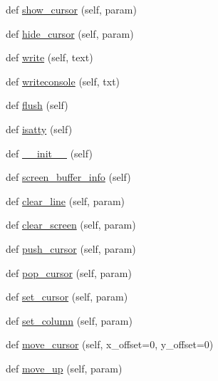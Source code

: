 \begin{DoxyCompactItemize}
def \hyperlink{classwaflib_1_1ansiterm_1_1_ansi_term_a594f6cf62d5e4ca33f2b88127fd6393d}{show\+\_\+cursor} (self, param)
\item 
def \hyperlink{classwaflib_1_1ansiterm_1_1_ansi_term_a2ca4bde33edd4afa92c8bda3f01d1dc9}{hide\+\_\+cursor} (self, param)
\item 
def \hyperlink{classwaflib_1_1ansiterm_1_1_ansi_term_a03ecdf1c9e54a69800aae320175c281b}{write} (self, text)
\item 
def \hyperlink{classwaflib_1_1ansiterm_1_1_ansi_term_a8296f875a3fd0a03fc109073f2a73a3e}{writeconsole} (self, txt)
\item 
def \hyperlink{classwaflib_1_1ansiterm_1_1_ansi_term_a08667242c11cdfd8b74d64f8191d4938}{flush} (self)
\item 
def \hyperlink{classwaflib_1_1ansiterm_1_1_ansi_term_a08e698612e76adc1aa3e26cdc5cb2009}{isatty} (self)
\item 
def \hyperlink{classwaflib_1_1ansiterm_1_1_ansi_term_ab397a7401f836bb9f96d9e54c6333821}{\+\_\+\+\_\+init\+\_\+\+\_\+} (self)
\item 
def \hyperlink{classwaflib_1_1ansiterm_1_1_ansi_term_afdb1bac8f2508bdf2279320b85286196}{screen\+\_\+buffer\+\_\+info} (self)
\item 
def \hyperlink{classwaflib_1_1ansiterm_1_1_ansi_term_ae9df276c42e0569ad63c20c19de62b93}{clear\+\_\+line} (self, param)
\item 
def \hyperlink{classwaflib_1_1ansiterm_1_1_ansi_term_aa94cc04f29c4c51e0013e5cb87c0fd07}{clear\+\_\+screen} (self, param)
\item 
def \hyperlink{classwaflib_1_1ansiterm_1_1_ansi_term_a9f489138508401c64c6927f215d8d6da}{push\+\_\+cursor} (self, param)
\item 
def \hyperlink{classwaflib_1_1ansiterm_1_1_ansi_term_a2093c2f7ded18188b0bf2989a0083a18}{pop\+\_\+cursor} (self, param)
\item 
def \hyperlink{classwaflib_1_1ansiterm_1_1_ansi_term_aba842837a7fe351aa8459aa375249c69}{set\+\_\+cursor} (self, param)
\item 
def \hyperlink{classwaflib_1_1ansiterm_1_1_ansi_term_acd65956a7d56681cc669acca5bdd43fb}{set\+\_\+column} (self, param)
\item 
def \hyperlink{classwaflib_1_1ansiterm_1_1_ansi_term_ade95c6eb1c7ed7928780aad4e6b4e268}{move\+\_\+cursor} (self, x\+\_\+offset=0, y\+\_\+offset=0)
\item 
def \hyperlink{classwaflib_1_1ansiterm_1_1_ansi_term_a7725bd9ed185458669ad7601fb7ff9d9}{move\+\_\+up} (self, param)

\end{DoxyCompactItemize}
